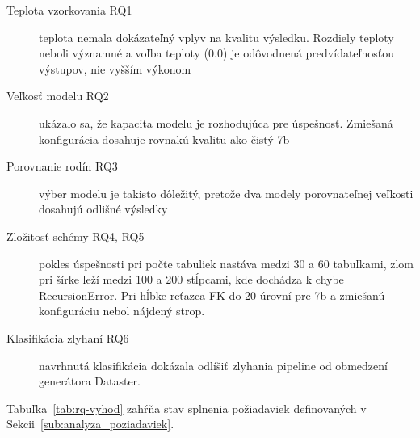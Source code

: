 \begin{description}
    \item[Teplota vzorkovania RQ1] teplota nemala dokázateľný vplyv na kvalitu výsledku. Rozdiely teploty neboli významné a voľba teploty (0.0) je odôvodnená predvídateľnosťou výstupov, nie vyšším výkonom
    \item[Veľkosť modelu RQ2] ukázalo sa, že kapacita modelu je rozhodujúca pre úspešnosť. Zmiešaná konfigurácia dosahuje rovnakú kvalitu ako čistý 7b 
    \item[Porovnanie rodín RQ3] výber modelu je takisto dôležitý, pretože dva modely porovnateľnej veľkosti dosahujú odlišné výsledky
    \item[Zložitosť schémy RQ4, RQ5] pokles úspešnosti pri počte tabuliek nastáva medzi 30 a 60 tabuľkami, zlom pri šírke leží medzi 100 a 200 stĺpcami, kde dochádza k chybe RecursionError. Pri hĺbke reťazca FK do 20 úrovní pre 7b a zmiešanú konfiguráciu nebol nájdený strop.
    \item[Klasifikácia zlyhaní RQ6] navrhnutá klasifikácia dokázala odlíšiť zlyhania pipeline od obmedzení generátora Dataster.
\end{description}


Tabuľka~\ref{tab:rq-vyhod} zahŕňa stav splnenia požiadaviek definovaných v Sekcii~\ref{sub:analyza_poziadaviek}.

